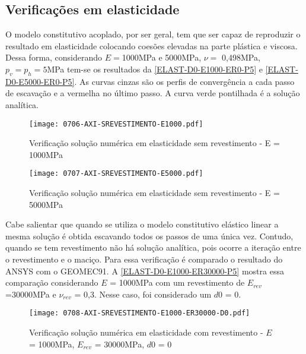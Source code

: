 \subsection{Verificações em elasticidade}

O modelo constitutivo acoplado, por ser geral, tem que ser capaz de reproduzir o resultado em elasticidade colocando coesões elevadas na parte plástica e viscosa. Dessa forma, considerando $E =$1000MPa e 5000MPa, $\nu =$ 0,498MPa, $p_v = p_h = 5$MPa tem-se os resultados da \autoref{ELAST-D0-E1000-ER0-P5} e \autoref{ELAST-D0-E5000-ER0-P5}. As curvas cinzas são os perfis de convergência a cada passo de escavação e a vermelha no último passo. A curva verde pontilhada é a solução analítica.

\begin{figure}[H]
	\begin{center}
		\texttt{[image: 0706-AXI-SREVESTIMENTO-E1000.pdf]}
	\end{center}
	\caption{\label{ELAST-D0-E1000-ER0-P5}Verificação solução numérica em elasticidade sem revestimento - E = 1000MPa}
\end{figure}

\begin{figure}[H]
	\begin{center}
		\texttt{[image: 0707-AXI-SREVESTIMENTO-E5000.pdf]}
	\end{center}
	\caption{\label{ELAST-D0-E5000-ER0-P5}Verificação solução numérica em elasticidade sem revestimento - E = 5000MPa}
\end{figure}

Cabe salientar que quando se utiliza o modelo constitutivo elástico linear a mesma solução é obtida escavando todos os passos de uma única vez. Contudo, quando se tem revestimento não há solução analítica, pois ocorre a iteração entre o revestimento e o maciço. Para essa verificação é comparado o resultado do ANSYS com o GEOMEC91. A \autoref{ELAST-D0-E1000-ER30000-P5} mostra essa comparação considerando $E$ = 1000MPa com um revestimento de $E_{rev}$=30000MPa e $\nu_{rev}$ = 0,3. Nesse caso, foi considerado um $d0$ = 0.

\begin{figure}[H]
	\begin{center}
		\texttt{[image: 0708-AXI-SREVESTIMENTO-E1000-ER30000-D0.pdf]}
	\end{center}
	\caption{\label{ELAST-D0-E1000-ER30000-P5}Verificação solução numérica em elasticidade com revestimento - $E$ = 1000MPa, $E_{rev}$ = 30000MPa, $d0$ = 0}
\end{figure}

